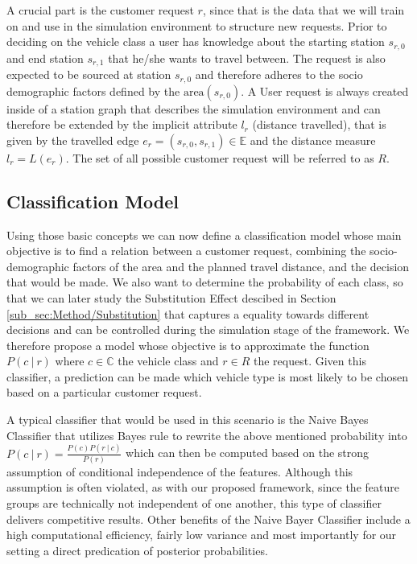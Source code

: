 A crucial part is the customer request $r$, since that is the data that we will train on and use in the simulation
environment to structure new requests. Prior to deciding on the vehicle class a user has knowledge about
the starting station $s_{r, 0}$ and end station $s_{r, 1}$ that he/she wants to travel between. The request is also expected
to be sourced at station $s_{r, 0}$ and therefore adheres to the socio demographic factors defined by the $\text{area}(s_{r, 0})$.
A User request is always created inside of a station graph that describes the simulation environment and can therefore
be extended by the implicit attribute $l_r$ (distance travelled), that is given by the travelled edge $e_r = (s_{r, 0}, s_{r, 1}) \in \mathbb{E}$
and the distance measure $l_r = L(e_r)$. The set of all possible customer request will be referred to as $R$.

\subsection{Classification Model}
\label{sub_sec:Method/Class}

Using those basic concepts we can now define a classification model whose
main objective is to find a relation between a customer request, combining the socio-demographic factors of the area
and the planned travel distance, and the decision that would be made. We also want to determine the
probability of each class, so that we can later study the Substitution Effect descibed in Section \ref{sub_sec:Method/Substitution}
that captures a equality towards different decisions and can be controlled during the
simulation stage of the framework. We therefore propose a model whose objective is to
approximate the function $P(c \ | \ r)$ where $c \in \mathbb{C}$ the vehicle class and  $r \in R$ the request.
Given this classifier, a prediction can be made which vehicle type is most likely to be chosen based
on a particular customer request.

A typical classifier that would be used in this scenario is the Naive Bayes Classifier that utilizes
Bayes rule to rewrite the above mentioned probability into $P(c \ | \ r) = \frac{P(c)P(r \ | \ c)}{P(r)}$
which can then be computed based on the strong assumption of conditional independence of the features.
Although this assumption is often violated, as with our proposed framework, since the feature groups
are technically not independent of one another, this type of classifier delivers competitive results.
Other benefits of the Naive Bayer Classifier include a high computational efficiency, fairly low variance
and most importantly for our setting a direct predication of posterior probabilities. \cite{Webb2010}

